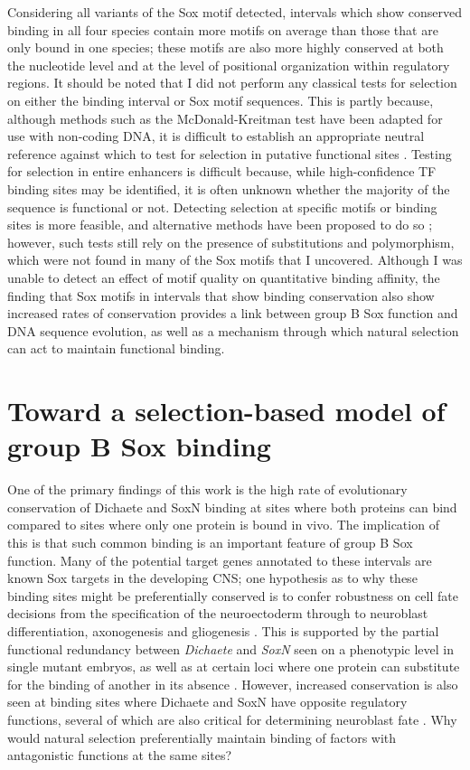 Considering all variants of the Sox motif detected, intervals which show conserved binding in all four species contain more motifs on average than those that are only bound in one species; these motifs are also more highly conserved at both the nucleotide level and at the level of positional organization within regulatory regions. It should be noted that I did not perform any classical tests for selection on either the binding interval or Sox motif sequences. This is partly because, although methods such as the McDonald-Kreitman test have been adapted for use with non-coding DNA, it is difficult to establish an appropriate neutral reference against which to test for selection in putative functional sites \citep{anisimova_methods_2012}. Testing for selection in entire enhancers is difficult because, while high-confidence TF binding sites may be identified, it is often unknown whether the majority of the sequence is functional or not. Detecting selection at specific motifs or binding sites is more feasible, and alternative methods have been proposed to do so \citep{moses_statistical_2009}; however, such tests still rely on the presence of substitutions and polymorphism, which were not found in many of the Sox motifs that I uncovered. Although I was unable to detect an effect of motif quality on quantitative binding affinity, the finding that Sox motifs in intervals that show binding conservation also show increased rates of conservation provides a link between group B Sox function and DNA sequence evolution, as well as a mechanism through which natural selection can act to maintain functional binding.  

\section{Toward a selection-based model of group B Sox binding}
One of the primary findings of this work is the high rate of evolutionary conservation of Dichaete and SoxN binding at sites where both proteins can bind compared to sites where only one protein is bound in vivo. The implication of this is that such common binding is an important feature of group B Sox function. Many of the potential target genes annotated to these intervals are known Sox targets in the developing CNS; one hypothesis as to why these binding sites might be preferentially conserved is to confer robustness on cell fate decisions from the specification of the neuroectoderm through to neuroblast differentiation, axonogenesis and gliogenesis \citep{ferrero_soxneuro_2014,wagner_distributed_2005,wagner_gene_2008}. This is supported by the partial functional redundancy between \emph{Dichaete} and \emph{SoxN} seen on a phenotypic level in single mutant embryos, as well as at certain loci where one protein can substitute for the binding of another in its absence \citep{ferrero_soxneuro_2014,overton_evidence_2002}. However, increased conservation is also seen at binding sites where Dichaete and SoxN have opposite regulatory functions, several of which are also critical for determining neuroblast fate \citep{aleksic_role_2013,ferrero_soxneuro_2014,overton_evidence_2002}. Why would natural selection preferentially maintain binding of factors with antagonistic functions at the same sites?\\


